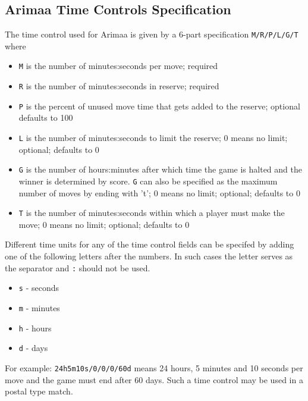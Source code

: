 \documentclass[10pt,dvipdfmx]{report}
\begin{document}
\subsection{Arimaa Time Controls Specification}
The time control used for Arimaa is given by a 6-part specification {\tt M/R/P/L/G/T} where
\begin{itemize}
\item {\tt M} is the number of minutes:seconds per move; required
\item {\tt R} is the number of minutes:seconds in reserve; required
\item {\tt P} is the percent of unused move time that gets
            added to the reserve; optional defaults to 100
\item {\tt L} is the number of minutes:seconds to limit the reserve;
            0 means no limit; optional; defaults to 0
\item {\tt G} is the number of hours:minutes after which time
            the game is halted and the winner is determined
            by score. {\tt G} can also be specified as the maximum
            number of moves by ending with 't'; 0 means no
            limit; optional; defaults to 0
\item {\tt T} is the number of minutes:seconds within which
            a player must make the move; 0 means no limit;
            optional; defaults to 0
\end{itemize}
Different time units for any of the time control fields
can be specifed by adding one of the following letters
after the numbers.  In such cases the letter serves as
the separator and {\tt :} should not be used.
\begin{itemize}
\item {\tt s} - seconds
\item {\tt m} - minutes
\item {\tt h} - hours
\item {\tt d} - days
\end{itemize}
For example:  {\tt 24h5m10s/0/0/0/60d} means 24 hours, 5 minutes
and 10 seconds per move and the game must end after 60 days.
Such a time control may be used in a postal type match.
\end{document}
